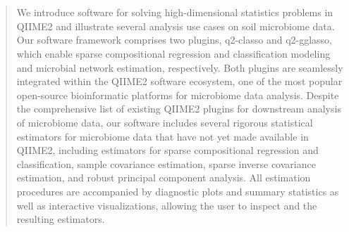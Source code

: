 \documentclass[10pt,a4paper]{article}
\begin{document}
\phantom{line keeping abstract on the left side}
\\
\\
\begin{abstract}



We introduce software for solving high-dimensional statistics problems in QIIME2 and illustrate several analysis use cases on soil microbiome data. Our software framework comprises two plugins, q2-classo and q2-gglasso, which 
enable sparse compositional regression and classification modeling and microbial network estimation, respectively. Both plugins are seamlessly integrated within the QIIME2 software ecosystem, one of the most popular open-source bioinformatic platforms for microbiome data analysis. Despite the comprehensive list of existing QIIME2 plugins for downstream analysis of microbiome data, our software includes several rigorous statistical estimators for microbiome data that have not yet made available in QIIME2, including estimators for sparse compositional regression and classification, sample covariance estimation, sparse inverse covariance estimation, and robust principal component analysis. All estimation procedures are accompanied by diagnostic plots and summary statistics as well as interactive visualizations, allowing the user to inspect and the resulting estimators.  




\end{abstract}
\end{document}
